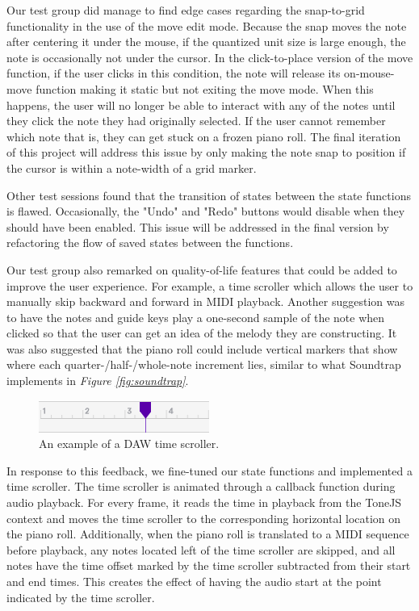 Our test group did manage to find edge cases regarding the snap-to-grid functionality in the use
of the move edit mode. Because the snap moves the note after centering it under the mouse, if the
quantized unit size is large enough, the note is occasionally not under the cursor. In the
click-to-place version of the move function, if the user clicks in this condition, the note will
release its on-mouse-move function making it static but not exiting the move mode. When this
happens, the user will no longer be able to interact with any of the notes until they click the
note they had originally selected. If the user cannot remember which note that is, they can get
stuck on a frozen piano roll. The final iteration of this project will address this issue by only
making the note snap to position if the cursor is within a note-width of a grid marker.

Other test sessions found that the transition of states between the state functions is flawed.
Occasionally, the "Undo" and "Redo" buttons would disable when they should have been enabled. This
issue will be addressed in the final version by refactoring the flow of saved states between the
functions.

Our test group also remarked on quality-of-life features that could be added to improve the user
experience. For example, a time scroller which allows the user to manually skip backward and
forward in MIDI playback. Another suggestion was to have the notes and guide keys play a
one-second sample of the note when clicked so that the user can get an idea of the melody they
are constructing. It was also suggested that the piano roll could include vertical markers that
show where each quarter-/half-/whole-note increment lies, similar to what Soundtrap implements in
\textit{Figure \ref{fig:soundtrap}}.

\begin{figure}[h!]
  \centering
  \includegraphics{image/Scroller.png}
  \caption{An example of a DAW time scroller.}
  \label{fig:scroller}
\end{figure}

In response to this feedback, we fine-tuned our state functions and implemented a time scroller.
The time scroller is animated through a callback function during audio playback. For every frame,
it reads the time in playback from the ToneJS context and moves the time scroller to the
corresponding horizontal location on the piano roll. Additionally, when the piano roll is
translated to a MIDI sequence before playback, any notes located left of the time scroller are
skipped, and all notes have the time offset marked by the time scroller subtracted from their start
and end times. This creates the effect of having the audio start at the point indicated by the time
scroller.

